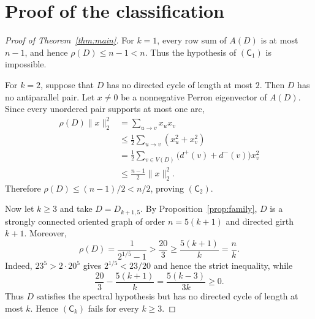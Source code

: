 \documentclass[11pt]{amsart}
\theoremstyle{remark}
\begin{document}
\section{Proof of the classification}

\begin{proof}[Proof of Theorem~\ref{thm:main}]
For $k=1$, every row sum of $A(D)$ is at most $n-1$, and hence
$\rho(D)\le n-1<n$. Thus the hypothesis of $(\mathsf C_1)$ is impossible.

For $k=2$, suppose that $D$ has no directed cycle of length at most $2$.
Then $D$ has no antiparallel pair. Let $x\ne0$ be a nonnegative Perron
eigenvector of $A(D)$. Since every unordered pair supports at most one arc,
\[
 \begin{aligned}
 \rho(D)\lVert x\rVert_2^2
 &=\sum_{u\to v}x_ux_v \\
 &\le \frac12\sum_{u\to v}(x_u^2+x_v^2) \\
 &=\frac12\sum_{v\in V(D)}
     \bigl(d^+(v)+d^-(v)\bigr)x_v^2 \\
 &\le \frac{n-1}{2}\lVert x\rVert_2^2.
 \end{aligned}
\]
Therefore $\rho(D)\le(n-1)/2<n/2$, proving $(\mathsf C_2)$.

Now let $k\ge3$ and take $D=D_{k+1,5}$. By
Proposition~\ref{prop:family}, $D$ is a strongly connected oriented graph
of order $n=5(k+1)$ and directed girth $k+1$. Moreover,
\[
 \rho(D)=\frac{1}{2^{1/5}-1}>\frac{20}{3}
 \ge \frac{5(k+1)}{k}=\frac{n}{k}.
\]
Indeed, $23^5>2\cdot20^5$ gives $2^{1/5}<23/20$ and hence the strict
inequality, while
\[
 \frac{20}{3}-\frac{5(k+1)}{k}
 =\frac{5(k-3)}{3k}\ge0.
\]
Thus $D$ satisfies the spectral hypothesis but has no directed cycle of
length at most $k$. Hence $(\mathsf C_k)$ fails for every $k\ge3$.
\end{proof}
\end{document}
